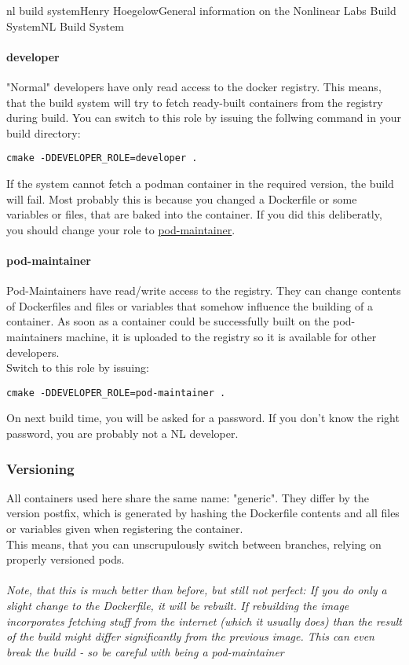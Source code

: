 \documentclass[11pt]{article}
\begin{document}
\begin{Name}{1}{nl build system}{Henry Hoegelow}{General information on the Nonlinear Labs Build System}{NL Build System}
\paragraph{developer}
"Normal" developers have only read access to the docker registry. This means, that the build system will try to fetch ready-built containers from the registry during build. You can switch to this role by issuing the follwing command in your build directory:
\begin{verbatim}
cmake -DDEVELOPER_ROLE=developer .
\end{verbatim}
If the system cannot fetch a podman container in the required version, the build will fail. Most probably this is because you changed a Dockerfile or some variables or files, that are baked into the container. If you did this deliberatly, you should change your role to \hyperref[pod-maintainer]{pod-maintainer}.

\paragraph{pod-maintainer} \label{pod-maintainer}
Pod-Maintainers have read/write access to the registry. They can change contents of Dockerfiles and files or variables that somehow influence the building of a container. As soon as a container could be successfully built on the pod-maintainers machine, it is uploaded to the registry so it is available for other developers.\\
Switch to this role by issuing:
\begin{verbatim}
cmake -DDEVELOPER_ROLE=pod-maintainer .
\end{verbatim}
On next build time, you will be asked for a password. If you don't know the right password, you are probably not a NL developer.

\subsubsection{Versioning}
All containers used here share the same name: "generic". They differ by the version postfix, which is generated by hashing the Dockerfile contents and all files or variables given when registering the container.\\
This means, that you can unscrupulously switch between branches, relying on properly versioned pods.\\
\\
\emph{Note, that this is much better than before, but still not perfect: If you do only a slight change to the Dockerfile, it will be rebuilt. If rebuilding the image incorporates fetching stuff from the internet (which it usually does) than the result of the build might differ significantly from the previous image. This can even break the build - so be careful with being a pod-maintainer}


\end{Name}
\end{document}
